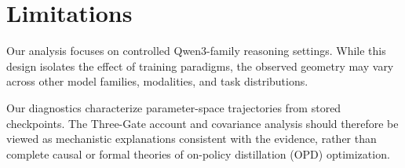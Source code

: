 \section*{Limitations}

Our analysis focuses on controlled Qwen3-family reasoning settings. While
this design isolates the effect of training paradigms, the observed geometry
may vary across other model families, modalities, and task distributions.

Our diagnostics characterize parameter-space trajectories from stored
checkpoints. The Three-Gate account and covariance analysis should therefore
be viewed as mechanistic explanations consistent with the evidence, rather
than complete causal or formal theories of on-policy distillation (OPD) optimization.